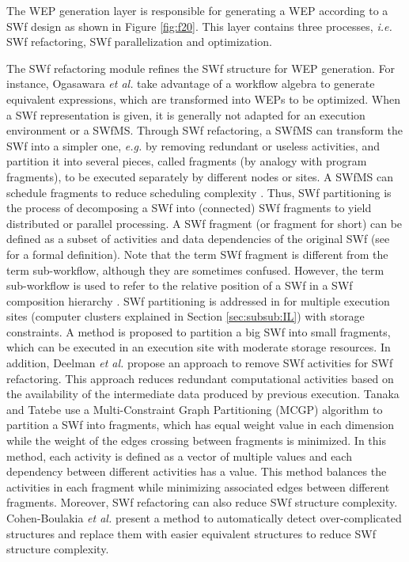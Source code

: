 The WEP generation layer is responsible for generating a WEP according to a SWf design as shown in Figure \ref{fig:f20}. 
This layer contains three processes, \textit{i.e.} SWf refactoring, SWf parallelization and optimization.

The SWf refactoring module refines the SWf structure for WEP generation.
For instance, Ogasawara \textit{et al.} \cite{Ogasawara2011,Ogasawara2013} take advantage of a workflow algebra to generate equivalent expressions, which are transformed into WEPs to be optimized. 
When a SWf representation is given, it is generally not adapted for an execution environment or a SWfMS.
Through SWf refactoring, a SWfMS can transform the SWf into a simpler one, 
\textit{e.g.} by removing redundant or useless activities, and partition it into several pieces, 
called fragments (by analogy with program fragments), to be executed separately by different nodes or sites. 
A SWfMS can schedule fragments to reduce scheduling complexity \cite{Chen2012a}.
Thus, SWf partitioning is the process of decomposing a SWf into (connected) SWf fragments to yield distributed \cite{Liu2014} or parallel processing. 
A SWf fragment (or fragment for short) can be defined as a subset of activities and data dependencies of the original 
SWf (see \cite{Ogasawara2011} for a formal definition). 
Note that the term SWf fragment is different from the term sub-workflow, although they are sometimes confused. 
However, the term sub-workflow is used to refer to the relative position of a SWf in a SWf composition hierarchy \cite{Aalst2003}. 
SWf partitioning is addressed in \cite{Chen2012a} for multiple execution sites (computer clusters explained in Section \ref{sec:subsub:IL}) with storage constraints.
A method is proposed to partition a big SWf into small fragments, which can be executed in an execution site with moderate storage resources.
In addition, Deelman \textit{et al.} \cite{Deelman2005} propose an approach to remove SWf activities for SWf refactoring. 
This approach reduces redundant computational activities based on the availability of the intermediate data produced by previous execution. 
Tanaka and Tatebe \cite{Tanaka2012} use a Multi-Constraint Graph Partitioning (MCGP) algorithm \cite{Karypis1998} to partition a SWf into fragments, 
which has equal weight value in each dimension while the weight of the edges crossing between fragments is minimized.
In this method, each activity is defined as a vector of multiple values 
and each dependency between different activities has a value.
This method balances the activities in each fragment while minimizing associated edges between different fragments.
Moreover, SWf refactoring can also reduce SWf structure complexity. 
Cohen-Boulakia \textit{et al.} \cite{Cohen-Boulakia2014} present a method to automatically detect over-complicated structures 
and replace them with easier equivalent structures to reduce SWf structure complexity.

